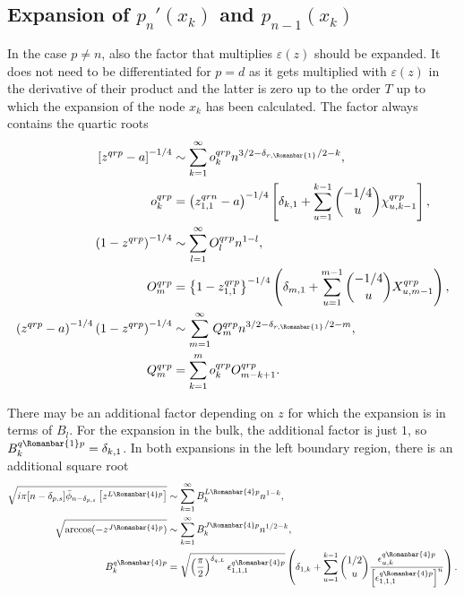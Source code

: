\documentclass[11pt]{article}
\newcommand*{\Chi}{X}
\newcommand*{\todo}[1]{{\color{red}?? TODO: #1 ??}}
\newcommand{\lln}{L{\tiny\Rleft} n}
\newcommand{\qg}{q}
\newcommand{\ql}{L}
\newcommand{\qj}{J}
\newcommand{\rg}{r}
\newcommand{\rb}{{\scriptsize \Romanbar{1}} }
\newcommand{\rl}{{\scriptsize \Romanbar{4}} }
\newcommand{\pg}{p}
\newcommand{\pn}{n}
\newcommand{\pd}{d}
\newcommand{\ps}{s}
\numberwithin{equation}{section}
\newcommand{\Rleft}{\Romanbar{4}}
\begin{document}
\subsection{Expansion of $p_n'(x_k)$ and $p_{n-1}(x_k)$}
In the case $\pg \neq \pn$, also the factor that multiplies $\varepsilon(z)$ should be expanded. It does not need to be differentiated for $\pg = \pd$ as it gets multiplied with $\varepsilon(z)$ in the derivative of their product and the latter is zero up to the order $T$ up to which the expansion of the node $x_k$ has been calculated. The factor always contains the quartic roots
\begin{align}
	\left[z^{\qg\rg\pg} -a\right]^{-1/4} & \sim \sum_{k=1}^\infty o_k^{\qg\rg\pg} n^{3/2 - \delta_{\rg,\rb}/2 -k}, \\ %
	o_k^{\qg\rg\pg} & = \left( z_{1,1}^{\qg\rg\pn} -a\right)^{-1/4}\left[\delta_{k,1}+ \sum_{u=1}^{k-1} {-1/4 \choose u} \chi_{u,k-1}^{\qg\rg\pg} \right], \\ 
	\left(1 - z^{\qg\rg\pg} \right)^{-1/4} & \sim \sum_{l=1}^\infty O_l^{\qg\rg\pg} n^{1-l}, \\
	O_m^{\qg\rg\pg} & = \left\{1-z_{1,1}^{\qg\rg\pg}\right\}^{-1/4} \left(\delta_{m,1} + \sum_{u=1}^{m-1} {-1/4 \choose u} \Chi_{u,m-1}^{\qg\rg\pg} \right), \\
	\left(z^{\qg\rg\pg} -a \right)^{-1/4} \left(1 - z^{\qg\rg\pg} \right)^{-1/4}  & \sim \sum_{m=1}^\infty Q_m^{\qg\rg\pg} n^{3/2 - \delta_{\rg,\rb}/2 -m}, \\ %
	Q_m^{\qg\rg\pg} & = \sum_{k=1}^m o_k^{\qg\rg\pg} O_{m-k+1}^{\qg\rg\pg}.
\end{align}

There may be an %
additional factor depending on $z$ for which the expansion is in terms of $B_l$. %
For the expansion in the bulk, the additional factor is just $1$, so $B_k^{\qg\rb\pg} = \delta_{k,1}$. In both expansions in the left boundary region, there is an additional square root 
\begin{align}
	\sqrt{i\pi[n-\delta_{\pg,\ps}]\bar{\phi}_{n-\delta_{\pg,\ps}}\left[z^{\ql\rl\pg}\right]} & \sim \sum_{k=1}^\infty B_k^{\ql\rl\pg} n^{1-k}, \\
	\sqrt{\arccos(-z^{\qj\rl\pg}) } & \sim \sum_{k=1}^\infty B_k^{\qj\rl\pg} n^{1/2-k}, \\
	B_k^{\qg\rl\pg} & = \sqrt{ \left(\frac{\pi}{2}\right)^{\delta_{\qg,\ql}} \epsilon_{1,1,1}^{\qg\rl\pg}} \left( \delta_{1,k} + \sum_{u=1}^{k-1} {1/2 \choose u} \frac{ \epsilon_{u,k}^{\qg\rl\pg} }{ \left[\epsilon_{1,1,1}^{\qg\rl\pg}\right]^u } \right).%
\end{align}
\end{document}
